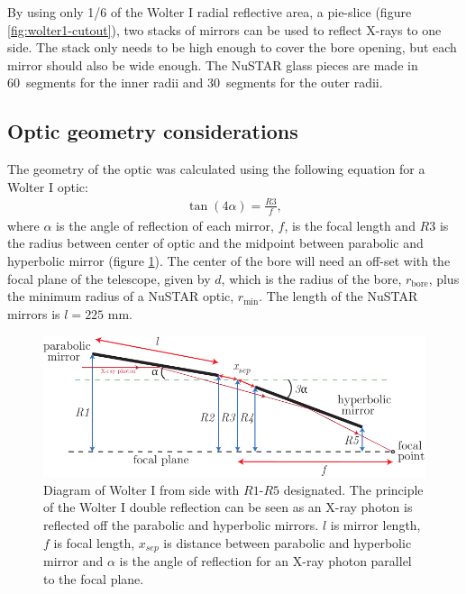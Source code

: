 By using only 1/6 of the Wolter I radial reflective area, a pie-slice (figure \ref{fig:wolter1-cutout}), two stacks of mirrors can be used to reflect X-rays to one side. The stack only needs to be high enough to cover the bore opening, but each mirror should also be wide enough. The NuSTAR glass pieces are made in 60\degr\ segments for the inner radii and 30\degr\ segments for the outer radii.

\subsection{Optic geometry considerations}
The geometry of the optic was calculated using the following equation for a Wolter I optic:
\begin{eqnarray}\label{eq:wolter}
  \tan(4\alpha) = \frac{\mathit{R3}}{f},
\end{eqnarray}
where $\alpha$ is the angle of reflection of each mirror, $f$, is the focal length and $\mathit{R3}$ is the radius between center of optic and the midpoint between parabolic and hyperbolic mirror (figure \ref{fig:wolter1-diagram}). The center of the bore will need an off-set with the focal plane of the telescope, given by $d$, which is the radius of the bore, $r_{\text{bore}}$, plus the minimum radius of a NuSTAR optic, $r_{\text{min}}$. The length of the NuSTAR mirrors is $l = 225$ mm.
\begin{figure}[htbp]
  \centering
    \includegraphics[width=0.95\linewidth]{figures/cast/wolter1-diagram.pdf}
  \caption{\footnotesize Diagram of Wolter I from side with $\mathit{R1}$-$\mathit{R5}$ designated. The principle of the Wolter I double reflection can be seen as an X-ray photon is reflected off the parabolic and hyperbolic mirrors. $l$ is mirror length, $f$ is focal length, $x_{sep}$ is distance between parabolic and hyperbolic mirror and $\alpha$ is the angle of reflection for an X-ray photon parallel to the focal plane.}
  \label{fig:wolter1-diagram}
\end{figure}

